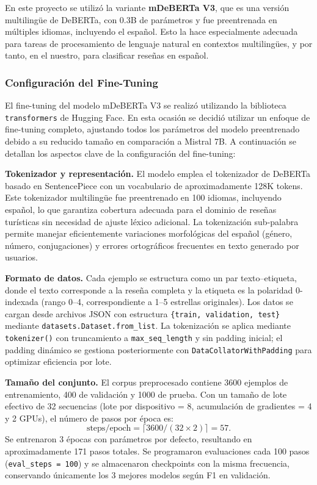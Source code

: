 \documentclass[paper=letter, fontsize=11pt, draft=false]{scrartcl}
\numberwithin{equation}{section} %
\numberwithin{figure}{section} %
\numberwithin{table}{section} %
\numberwithin{subsection}{section}
\begin{document}
En este proyecto se utilizó la variante \textbf{mDeBERTa V3}, que es una versión multilingüe de DeBERTa, con 0.3B de parámetros y fue preentrenada en múltiples idiomas, incluyendo el español. Esto la hace especialmente adecuada para tareas de procesamiento de lenguaje natural en contextos multilingües, y por tanto, en el nuestro, para clasificar reseñas en español.

\subsubsection{Configuración del Fine-Tuning}

El fine-tuning del modelo mDeBERTa V3 se realizó utilizando la biblioteca \texttt{transformers} de Hugging Face. En esta ocasión se decidió utilizar un enfoque de fine-tuning completo, ajustando todos los parámetros del modelo preentrenado debido a su reducido tamaño en comparación a Mistral 7B. A continuación se detallan los aspectos clave de la configuración del fine-tuning:

\textbf{Tokenizador y representación.} El modelo emplea el tokenizador de DeBERTa basado en SentencePiece con un vocabulario de aproximadamente 128K tokens. Este tokenizador multilingüe fue preentrenado en 100 idiomas, incluyendo español, lo que garantiza cobertura adecuada para el dominio de reseñas turísticas sin necesidad de ajuste léxico adicional. La tokenización sub-palabra permite manejar eficientemente variaciones morfológicas del español (género, número, conjugaciones) y errores ortográficos frecuentes en texto generado por usuarios.

\textbf{Formato de datos.} Cada ejemplo se estructura como un par texto–etiqueta, donde el texto corresponde a la reseña completa y la etiqueta es la polaridad 0-indexada (rango 0–4, correspondiente a 1–5 estrellas originales). Los datos se cargan desde archivos JSON con estructura \texttt{\{train, validation, test\}} mediante \texttt{datasets.Dataset.from\_list}. La tokenización se aplica mediante \texttt{tokenizer()} con truncamiento a \texttt{max\_seq\_length} y sin padding inicial; el padding dinámico se gestiona posteriormente con \texttt{DataCollatorWithPadding} para optimizar eficiencia por lote.

\textbf{Tamaño del conjunto.} El corpus preprocesado contiene 3600 ejemplos de entrenamiento, 400 de validación y 1000 de prueba. Con un tamaño de lote efectivo de 32 secuencias (lote por dispositivo = 8, acumulación de gradientes = 4 y 2 GPUs), el número de pasos por época es:
\[
\text{steps/epoch} = \lceil 3600 / (32\times2) \rceil = 57.
\]
Se entrenaron 3 épocas con parámetros por defecto, resultando en aproximadamente 171 pasos totales. Se programaron evaluaciones cada 100 pasos (\texttt{eval\_steps = 100}) y se almacenaron checkpoints con la misma frecuencia, conservando únicamente los 3 mejores modelos según F1 en validación.
\end{document}
